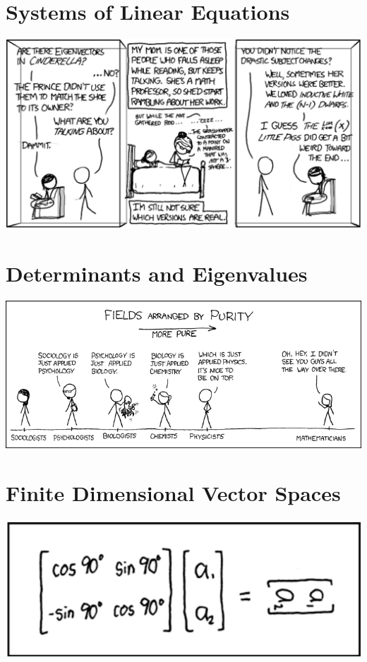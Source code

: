 \documentclass[oneside]{book}
\begin{document}
\chapter{Systems of Linear Equations}

    

\begin{savequote}
    \includegraphics[scale=0.4]{Graphics/eigenvectorxkcd.png}
\end{savequote}
\chapter{Determinants and Eigenvalues}

    

\begin{savequote}
    \includegraphics[scale=0.4]{Graphics/puremathxkcd.png}
\end{savequote}
\chapter{Finite Dimensional Vector Spaces}

    

\begin{savequote}
\includegraphics[scale=0.45]{Graphics/rotationmatrix.png}
\end{savequote}
\end{document}
